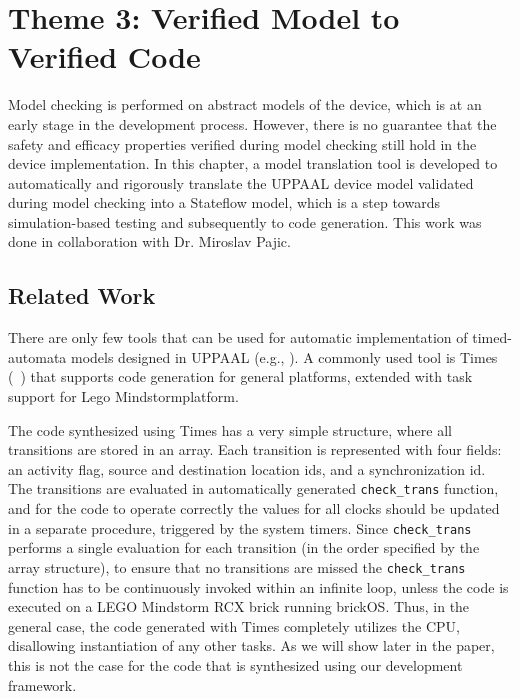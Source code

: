 \chapter{Theme 3: Verified Model to Verified Code}
Model checking is performed on abstract models of the device, which is at an early stage in the development process. 
However, there is no guarantee that the safety and efficacy properties verified during model checking still hold in the device implementation.
In this chapter, a model translation tool is developed to automatically and rigorously translate the UPPAAL device model validated during model checking into a Stateflow model, which is a step towards simulation-based testing and subsequently to code generation. 
This work was done in collaboration with Dr. Miroslav Pajic.

\section{Related Work}
\label{sec:code_gen}
There are only few tools that can be used for automatic implementation of timed-automata models designed in UPPAAL (e.g., \cite{times,up2nqc}). A commonly used tool is Times (~\cite{times}) that supports code generation for general platforms, extended with task support for {Lego Mindstorm}\texttrademark  platform. 

The code synthesized using Times has a very simple structure, where all transitions are stored in an array. Each transition is represented with four fields: an activity flag, source and destination location ids, and a synchronization id. The transitions are evaluated in automatically generated \texttt{check\_trans} function, and for the code to operate correctly the values for all clocks should be updated in a separate procedure, triggered by the system timers. Since \texttt{check\_trans} performs a single evaluation for each transition (in the order specified by the array structure), to ensure that no transitions are missed the \texttt{check\_trans} function has to be continuously invoked within an infinite loop, unless the code is executed on a LEGO Mindstorm RCX brick running brickOS. Thus, in the general case, the code generated with Times completely utilizes the CPU, disallowing instantiation of any other tasks. As we will show later in the paper, this is not the case for the code that is synthesized using our development framework.

